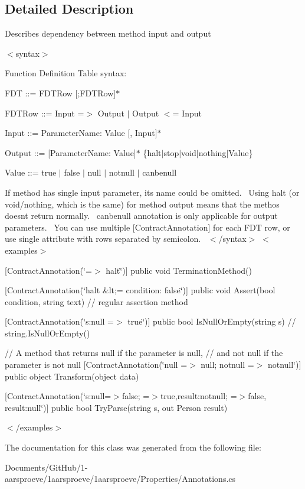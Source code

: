 \subsection{Detailed Description}
Describes dependency between method input and output 

$<$syntax$>$ 

Function Definition Table syntax\+:


\begin{DoxyItemize}
\item F\+D\+T \+:\+:= F\+D\+T\+Row \mbox{[};F\+D\+T\+Row\mbox{]}$\ast$ 
\item F\+D\+T\+Row \+:\+:= Input =$>$ Output $\vert$ Output $<$= Input 
\item Input \+:\+:= Parameter\+Name\+: Value \mbox{[}, Input\mbox{]}$\ast$ 
\item Output \+:\+:= \mbox{[}Parameter\+Name\+: Value\mbox{]}$\ast$ \{halt$\vert$stop$\vert$void$\vert$nothing$\vert$\+Value\} 
\item Value \+:\+:= true $\vert$ false $\vert$ null $\vert$ notnull $\vert$ canbenull 
\end{DoxyItemize}If method has single input parameter, it\textquotesingle{}s name could be omitted.~\newline
 Using {\ttfamily halt} (or {\ttfamily void}/{\ttfamily nothing}, which is the same) for method output means that the methos doesn\textquotesingle{}t return normally.~\newline
 {\ttfamily canbenull} annotation is only applicable for output parameters.~\newline
 You can use multiple {\ttfamily \mbox{[}Contract\+Annotation\mbox{]}} for each F\+D\+T row, or use single attribute with rows separated by semicolon.~\newline
 $<$/syntax$>$ $<$examples$>$
\begin{DoxyItemize}
\item {\ttfamily  \mbox{[}Contract\+Annotation(\char`\"{}=$>$ halt\char`\"{})\mbox{]} public void Termination\+Method() } 
\item {\ttfamily  \mbox{[}Contract\+Annotation(\char`\"{}halt \&lt;= condition\+: false\char`\"{})\mbox{]} public void Assert(bool condition, string text) // regular assertion method } 
\item {\ttfamily  \mbox{[}Contract\+Annotation(\char`\"{}s\+:null =$>$ true\char`\"{})\mbox{]} public bool Is\+Null\+Or\+Empty(string s) // string.\+Is\+Null\+Or\+Empty() } 
\item {\ttfamily  // A method that returns null if the parameter is null, // and not null if the parameter is not null \mbox{[}Contract\+Annotation(\char`\"{}null =$>$ null; notnull =$>$ notnull\char`\"{})\mbox{]} public object Transform(object data) } 
\item {\ttfamily  \mbox{[}Contract\+Annotation(\char`\"{}s\+:null=$>$false; =$>$true,result\+:notnull; =$>$false, result\+:null\char`\"{})\mbox{]} public bool Try\+Parse(string s, out Person result) } 
\end{DoxyItemize}$<$/examples$>$ 

The documentation for this class was generated from the following file\+:\begin{DoxyCompactItemize}
\item 
Documents/\+Git\+Hub/1-\/aarsproeve/1aarsproeve/1aarsproeve/\+Properties/Annotations.\+cs\end{DoxyCompactItemize}
